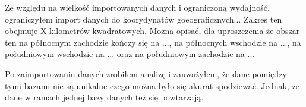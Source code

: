 Ze względu na wielkość importowanych danych i ograniczoną wydajność, ograniczyłem import danych do koorydynatów goeograficznych... 
Zakres ten obejmuje X kilometrów kwadratowych. Można opisać, dla uproszczenia że obszar ten na północnym zachodzie kończy się na ..., na północnych wschodzie na ..., na południowym wschodzie na ... oraz na południowym zachodzie na ...



Po zaimportowaniu danych zrobiłem analizę i zauważyłem, że dane pomiędzy tymi bazami nie są unikalne czego można było się akurat spodziewać. Jednak, że dane w ramach jednej bazy danych też się powtarzają.



